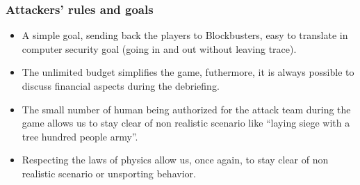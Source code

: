 \documentclass[11pt]{article} %
\begin{document}
\subsubsection{Attackers' rules and goals}
\begin{itemize}
\item A simple goal, sending back the players to Blockbusters, easy to translate in computer 
security goal (going in and out without leaving trace).
\item The unlimited budget simplifies the game, futhermore, it is always possible to discuss 
financial aspects during the debriefing.
\item The small number of human being authorized for the attack team during the game 
allows us to stay clear of non realistic scenario like ``laying siege with a tree hundred people army''.
\item Respecting the laws of physics allow us, once again, to stay clear of non realistic scenario or 
unsporting behavior.
\end{itemize}

\end{document}
